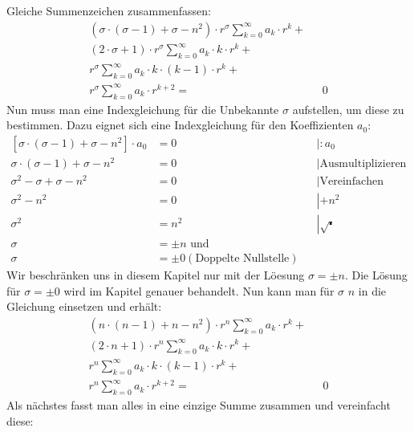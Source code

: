 \begin{refsection}
Gleiche Summenzeichen zusammenfassen:
\begin{align*}
	\left(
	\sigma \cdot \left( \sigma - 1 \right)
	+
	\sigma
	-
	n^2
	\right)
	\cdot r^{\sigma}
	\sum_{k=0}^{\infty} a_k \cdot r^k
	+ \\
	\left(	
	2 \cdot \sigma
	+
	1
	\right)
	\cdot r^{\sigma}
	\sum_{k=0}^{\infty} a_k \cdot k \cdot r^k
	+ \\
	r^{\sigma}
	\sum_{k=0}^{\infty} a_k \cdot k \cdot \left( k - 1 \right) \cdot r^k
	+ \\
	r^{\sigma}
	\sum_{k=0}^{\infty} a_k \cdot r^{k + 2}
	= & \text{ } 0
\end{align*}
Nun muss man eine Indexgleichung für die Unbekannte $\sigma$ aufstellen, um diese zu bestimmen.
Dazu eignet sich eine Indexgleichung f\"ur den Koeffizienten $a_0$:
\begin{align*}
	\left[ \sigma \cdot \left( \sigma -1 \right) + \sigma - n^2 \right] \cdot a_0 &= 0 && \left| :a_0 \right. \\
	\sigma \cdot \left( \sigma -1 \right) + \sigma - n^2 &= 0 && \left| \text{Ausmultiplizieren} \right. \\
	\sigma ^2 - \sigma + \sigma -n^2 &= 0 && \left| \text{Vereinfachen} \right.\\
	\sigma ^2 - n^2 &= 0 && \left| +n^2 \right.\\
	\sigma ^2 &= n^2 && \left| \sqrt{\centerdot} \right. \\
	\sigma &= \pm n \text{ und } \\
	\sigma &= \pm 0 \left( \text{Doppelte Nullstelle} \right)
\end{align*}
Wir beschr\"anken uns in diesem Kapitel nur mit der L\"oesung $\sigma = \pm n$. Die L\"osung f\"ur $\sigma = \pm 0$ wird im Kapitel  genauer behandelt.
Nun kann man f\"ur $\sigma$ $n$ in die Gleichung einsetzen und erh\"alt:
\begin{align*}
	\left(
	n \cdot \left( n - 1 \right)
	+
	n
	-
	n^2
	\right)
	\cdot r^{n}
	\sum_{k=0}^{\infty} a_k \cdot r^k
	+ \\
	\left(	
	2 \cdot n
	+
	1
	\right)
	\cdot r^{n}
	\sum_{k=0}^{\infty} a_k \cdot k \cdot r^k
	+ \\
	r^{n}
	\sum_{k=0}^{\infty} a_k \cdot k \cdot \left( k - 1 \right) \cdot r^k
	+ \\
	r^{n}
	\sum_{k=0}^{\infty} a_k \cdot r^{k + 2}
	= & \text{ } 0
\end{align*}
Als n\"achstes fasst man alles in eine einzige Summe zusammen und vereinfacht diese:

\end{refsection}
